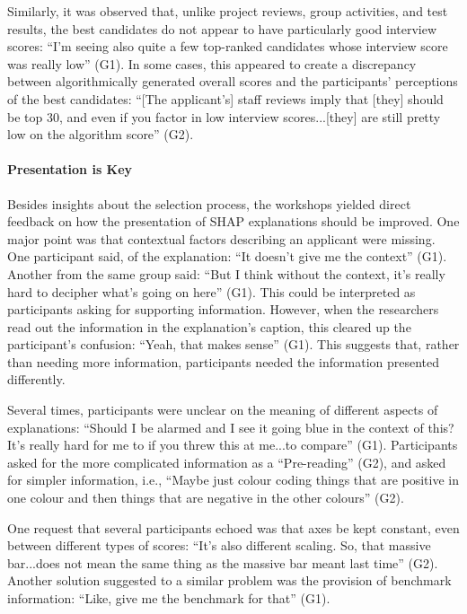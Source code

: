 Similarly, it was observed that, unlike project reviews, group activities, and test results, the best candidates do not appear to have particularly good interview scores: ``I'm seeing also quite a few top-ranked candidates whose interview score was really low'' (G1). In some cases, this appeared to create a discrepancy between algorithmically generated overall scores and the participants' perceptions of the best candidates: ``[The applicant's] staff reviews imply that [they] should be top 30, and even if you factor in low interview scores...[they] are still pretty low on the algorithm score'' (G2).

\paragraph{Presentation is Key}
Besides insights about the selection process, the workshops yielded direct feedback on how the presentation of SHAP explanations should be improved. One major point was that contextual factors describing an applicant were missing. One participant said, of the explanation: ``It doesn't give me the context'' (G1). Another from the same group said: ``But I think without the context, it's really hard to decipher what's going on here'' (G1). This could be interpreted as participants asking for supporting information. However, when the researchers read out the information in the explanation's caption, this cleared up the participant's confusion: ``Yeah, that makes sense'' (G1). This suggests that, rather than needing more information, participants needed the information presented differently.

Several times, participants were unclear on the meaning of different aspects of explanations: ``Should I be alarmed and I see it going blue in the context of this? It's really hard for me to if you threw this at me...to compare'' (G1). Participants asked for the more complicated information as a ``Pre-reading'' (G2), and asked for simpler information, i.e., ``Maybe just colour coding things that are positive in one colour and then things that are negative in the other colours'' (G2).

One request that several participants echoed was that axes be kept constant, even between different types of scores: ``It's also different scaling. So, that massive bar...does not mean the same thing as the massive bar meant last time'' (G2). Another solution suggested to a similar problem was the provision of benchmark information: ``Like, give me the benchmark for that'' (G1).

